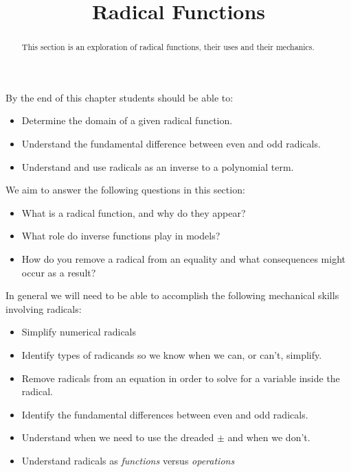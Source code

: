\documentclass{ximera}
\title{Radical Functions}
\begin{document}
\begin{abstract}
    This section is an exploration of radical functions, their uses and their mechanics.
\end{abstract}
\maketitle
By the end of this chapter students should be able to:

\begin{itemize}
    \item Determine the domain of a given radical function.
    \item Understand the fundamental difference between even and odd radicals.
    \item Understand and use radicals as an inverse to a polynomial term.
\end{itemize}

We aim to answer the following questions in this section:

\begin{itemize}
    \item What is a radical function, and why do they appear?\\
    \item What role do inverse functions play in models?\\
    \item How do you remove a radical from an equality and what consequences might occur as a result?
\end{itemize}

In general we will need to be able to accomplish the following mechanical skills involving radicals:
\begin{itemize}
    \item Simplify numerical radicals
    \item Identify types of radicands so we know when we can, or can't, simplify.
    \item Remove radicals from an equation in order to solve for a variable inside the radical.
    \item Identify the fundamental differences between even and odd radicals.
    \item Understand when we need to use the dreaded $\pm$ and when we don't.
    \item Understand radicals as \textit{functions} versus \textit{operations}
\end{itemize}
\end{document}
